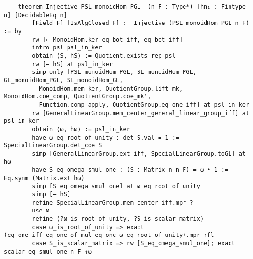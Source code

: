 \begin{footnotesize}
    \begin{verbatim}
    theorem Injective_PSL_monoidHom_PGL  (n F : Type*) [hn₁ : Fintype n] [DecidableEq n]
        [Field F] [IsAlgClosed F] :  Injective (PSL_monoidHom_PGL n F) := by
        rw [← MonoidHom.ker_eq_bot_iff, eq_bot_iff]
        intro psl psl_in_ker
        obtain ⟨S, hS⟩ := Quotient.exists_rep psl
        rw [← hS] at psl_in_ker
        simp only [PSL_monoidHom_PGL, SL_monoidHom_PGL, GL_monoidHom_PGL, SL_monoidHom_GL,
          MonoidHom.mem_ker, QuotientGroup.lift_mk, MonoidHom.coe_comp, QuotientGroup.coe_mk',
          Function.comp_apply, QuotientGroup.eq_one_iff] at psl_in_ker
        rw [GeneralLinearGroup.mem_center_general_linear_group_iff] at psl_in_ker
        obtain ⟨ω, hω⟩ := psl_in_ker
        have ω_eq_root_of_unity : det S.val = 1 := SpecialLinearGroup.det_coe S
        simp [GeneralLinearGroup.ext_iff, SpecialLinearGroup.toGL] at hω
        have S_eq_omega_smul_one : (S : Matrix n n F) = ω • 1 := Eq.symm (Matrix.ext hω)
        simp [S_eq_omega_smul_one] at ω_eq_root_of_unity
        simp [← hS]
        refine SpecialLinearGroup.mem_center_iff.mpr ?_
        use ω
        refine ⟨?ω_is_root_of_unity, ?S_is_scalar_matrix⟩
        case ω_is_root_of_unity => exact (eq_one_iff_eq_one_of_mul_eq_one ω_eq_root_of_unity).mpr rfl
        case S_is_scalar_matrix => rw [S_eq_omega_smul_one]; exact scalar_eq_smul_one n F ↑ω
    \end{verbatim}
    \end{footnotesize}
    
